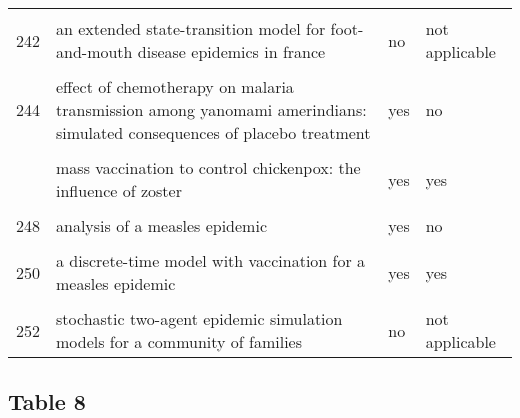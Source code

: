 \documentclass[
]{article}
\begin{document}
\begin{landscape}
\begin{longtable}{l>{\raggedright\arraybackslash}p{9cm}ll}
\addlinespace
\cellcolor{gray!6}{241} & \cellcolor{gray!6}{dynamics of the 2001 uk foot and mouth epidemic: stochastic dispersal in a heterogeneous landscape} & \cellcolor{gray!6}{yes} & \cellcolor{gray!6}{no}\\
242 & an extended state-transition model for foot-and-mouth disease epidemics in france & no & not applicable\\
\cellcolor{gray!6}{243} & \cellcolor{gray!6}{simulated economic consequences of foot-and-mouth disease epidemics and their public control in france} & \cellcolor{gray!6}{no} & \cellcolor{gray!6}{not applicable}\\
244 & effect of chemotherapy on malaria transmission among yanomami amerindians: simulated consequences of placebo treatment & yes & no\\
\cellcolor{gray!6}{245} & \cellcolor{gray!6}{modelling vaccination strategy against directly transmitted diseases using a series of pulses} & \cellcolor{gray!6}{yes} & \cellcolor{gray!6}{no}\\
\addlinespace
246 & mass vaccination to control chickenpox: the influence of zoster & yes & yes\\
\cellcolor{gray!6}{247} & \cellcolor{gray!6}{an evaluation of alternate control strategies for foot-and-mouth disease in australia: a regional approach} & \cellcolor{gray!6}{no} & \cellcolor{gray!6}{not applicable}\\
248 & analysis of a measles epidemic & yes & no\\
\cellcolor{gray!6}{249} & \cellcolor{gray!6}{a model of the transmission of dengue fever with an evaluation of the impact of ultra-low volume (ulv) insecticide applications on dengue epidemics} & \cellcolor{gray!6}{no} & \cellcolor{gray!6}{not applicable}\\
250 & a discrete-time model with vaccination for a measles epidemic & yes & yes\\
\addlinespace
\cellcolor{gray!6}{251} & \cellcolor{gray!6}{a stochastic model of epidemics in military recruits} & \cellcolor{gray!6}{no} & \cellcolor{gray!6}{not applicable}\\
252 & stochastic two-agent epidemic simulation models for a community of families & no & not applicable\\*
\end{longtable}
\endgroup{}
\end{landscape}

\hypertarget{table-8}{%
\subsection{Table 8}\label{table-8}}
\end{document}
